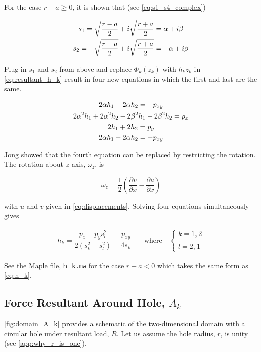 \documentclass{article}
\begin{document}
For the case $r-a \geq 0$, it is shown that (see \cref{eq:s1_s4_complex})

\begin{gather*}
    s_1 = \sqrt{\dfrac{r-a}{2}} + i \sqrt{\dfrac{r+a}{2}} = \alpha + i\beta \notag\\
    s_2 = -\sqrt{\dfrac{r-a}{2}} + i \sqrt{\dfrac{r+a}{2}} = -\alpha + i\beta 
\end{gather*}

Plug in $s_1$ and $s_2$ from above and replace $\Phi_k(z_k)$ with $h_k z_k$ in \cref{eq:resultant_h_k} result in four new equations in which the first and last are the same.

\begin{gather*}
    2 \alpha h_1 - 2 \alpha h_2 = -p_{xy}  \notag \\
    2 \alpha^2 h_1 + 2 \alpha^2 h_2 - 2 \beta^2 h_1 - 2 \beta^2 h_2 = p_x  \notag \\
    2 h_1 + 2 h_2 = p_y  \notag \\
    2 \alpha h_1 - 2 \alpha h_2 = -p_{xy}  \notag
\end{gather*}

Jong \cite{Jong1987} showed that the fourth equation can be replaced by restricting the rotation. The rotation about $z$-axis, $\omega_z$, is

\begin{equation*}
    \omega_z = \dfrac{1}{2} (\dfrac{\partial v}{\partial x} - \dfrac{\partial u}{\partial x})
\end{equation*}

with $u$ and $v$ given in \cref{eq:displacements}. Solving four equations simultaneously gives \cite{Jong1987}

\begin{equation}
    \begin{matrix}
    h_k = \dfrac{p_x - p_y s_l^2}{2 (s_k^2 - s_l^2)} - \dfrac{p_{xy}}{4 s_k} &
    \quad \text{where} \quad 
    \left\{\begin{matrix}
    k = 1, 2  \\ 
    \\
    l = 2, 1
    \end{matrix}\right.
    \end{matrix}
    \label{eq:h_k}
\end{equation}

See the Maple file, \texttt{h$\_\_$k.mw} for the case $r-a < 0$ which takes the same form as \cref{eq:h_k}.

\subsection{Force Resultant Around Hole, \texorpdfstring{$A_k$}{}} \label{sec:A_k}
\cref{fig:domain_A_k} provides a schematic of the two-dimensional domain with a circular hole under resultant load, $R$. Let us assume the hole radius, $r$, is unity (see \cref{app:why_r_is_one}).
\end{document}
